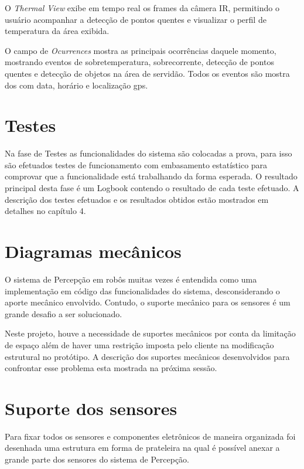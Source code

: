 \begin{itemize}
	O \textit{Thermal View} exibe em  tempo real os frames da câmera IR, permitindo o usuário acompanhar a detecção de pontos quentes e visualizar o perfil de temperatura da área exibida. 
	
	O campo de \textit{Ocurrences} mostra as principais ocorrências daquele momento, mostrando eventos de sobretemperatura, sobrecorrente, detecção de pontos quentes e detecção de objetos na área de servidão. Todos os eventos são mostra
	dos com data, horário e localização gps. 
	
	
	\section{Testes}
	Na fase de Testes as funcionalidades do sistema são colocadas a prova, para isso são efetuados testes de funcionamento com embasamento estatístico para comprovar que a funcionalidade está trabalhando da forma esperada. O resultado principal desta fase é um Logbook contendo o resultado de cada teste efetuado. A descrição dos testes efetuados e os resultados obtidos estão mostrados em detalhes no capítulo 4.
	
	\section{Diagramas mecânicos}
	\label{sec:diagm}
	O sistema de Percepção em robôs muitas vezes é entendida como uma implementação em código das funcionalidades do sistema, desconsiderando o aporte mecânico envolvido. Contudo, o suporte mecânico para os sensores é um grande desafio a ser solucionado. 
	
	Neste projeto, houve a necessidade de suportes mecânicos por conta da limitação de espaço além de haver uma restrição imposta pelo cliente na modificação estrutural no protótipo. A descrição dos suportes mecânicos desenvolvidos para confrontar esse problema esta mostrada na próxima sessão.
	
	\section{Suporte dos sensores}
	
	Para  fixar  todos  os  sensores  e  componentes  eletrônicos  de  maneira  organizada foi desenhada uma estrutura em forma de prateleira  na qual é possível anexar a grande parte dos sensores do sistema de Percepção.
	

\end{itemize}
